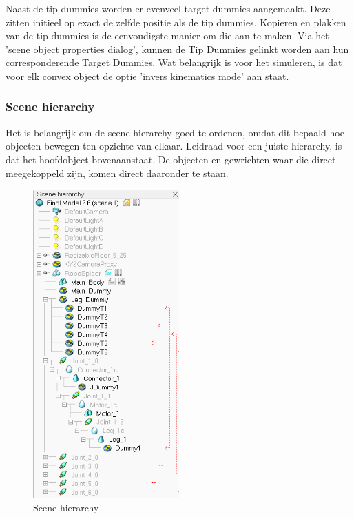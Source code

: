 \documentclass[10pt,a4paper]{article}
\begin{document}
Naast de tip dummies worden er evenveel target dummies aangemaakt. Deze zitten initieel op exact de zelfde positie als de tip dummies. Kopieren en plakken van de tip dummies is de eenvoudigste manier om die aan te maken. Via het 'scene object properties dialog', kunnen de Tip Dummies gelinkt worden aan hun corresponderende Target Dummies. Wat belangrijk is voor het simuleren, is dat voor elk convex object de optie 'invers kinematics mode' aan staat.

\subsubsection{Scene hierarchy}
Het is belangrijk om de scene hierarchy goed te ordenen, omdat dit bepaald hoe objecten bewegen ten opzichte van elkaar. Leidraad voor een juiste hierarchy, is dat het hoofdobject bovenaanstaat. De objecten en gewrichten waar die direct meegekoppeld zijn, komen direct daaronder te staan.

\begin{figure}[h]
    \centering
    \includegraphics[width=0.5\textwidth]{Scene-hierarchy}
    \caption{Scene-hierarchy}
    \label{fig:Scene-hierarchy}
\end{figure}
\end{document}
